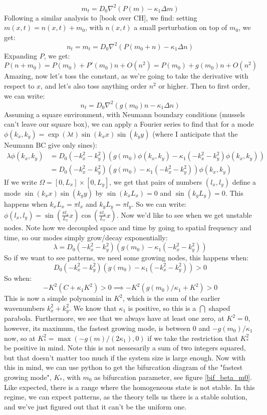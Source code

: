 \documentclass[a4paper]{jpconf}
\begin{document}
\[
m_t = D_0\nabla^2(P(m)-\kappa_1\Delta m)
\]
Following a similar analysis to [book over CH], we find:
setting $m(x,t)=n(x,t)+m_0$, with $n(x,t)$ a small perturbation on top of $m_0$, we get:
\[
n_t = m_t = D_0\nabla^2(P(m_0+n)-\kappa_1\Delta n)
\]
Expanding $P$, we get:
\[
P(n+m_0) = P(m_0)+P'(m_0)n+O(n^2) = P(m_0)+g(m_0)n+O(n^2)
\]
Amazing, now let's toss the constant, as we're going to take the derivative with respect to $x$, and let's also toss anything order $n^2$ or higher. Then to first order, we can write:
\[
n_t  = D_0\nabla^2(g(m_0)n-\kappa_1\Delta n)
\]
Assuming a square environment, with Neumann boundary conditions (mussels can't leave our square box), we can apply a Fourier series to find that for a mode $\phi(k_x,k_y)=\exp(\lambda t)\sin(k_xx)\sin(k_yy)$ (where I anticipate that the Neumann BC give only sines): 
\[\begin{aligned}
\lambda\phi(k_x,k_y) &= D_0(-k_x^2-k_y^2)(g(m_0)\phi(k_x,k_y)-\kappa_1 (-k_x^2-k_y^2) \phi(k_x,k_y))\\
&= D_0(-k_x^2-k_y^2)(g(m_0)-\kappa_1 (-k_x^2-k_y^2) )\phi(k_x,k_y)
\end{aligned}\]
If we write $\Omega=[0,L_x]\times[0,L_y]$, we get that pairs of numbers $(l_x,l_y)$ define a mode $\sin(k_xx)\sin(k_yy)$ by $\sin(k_xL_x)=0$ and $\sin(k_yL_y)=0$. This happens when $k_xL_x =\pi l_x$ and $k_yL_y=\pi l_y$. So we can write: $\phi(l_x,l_y)=\sin\left(\frac{\pi l_x}{L_x}x\right)\cos\left(\frac{\pi l_x}{L_x}x\right)$. 
Now we'd like to see when we get unstable nodes. Note how we decoupled space and time by going to spatial frequency and time, so our modes simply grow/decay exponentially:
\[
\lambda = D_0(-k_x^2-k_y^2)(g(m_0)-\kappa_1 (-k_x^2-k_y^2) )
\]
So if we want to see patterns, we need some growing nodes, this happens when:
\[
D_0(-k_x^2-k_y^2)(g(m_0)-\kappa_1 (-k_x^2-k_y^2) )>0
\]
So when:
\[
-K^2(C+\kappa_1K^2)>0\implies -K^2(g(m_0)/\kappa_1+K^2)>0
\]
This is now a simple polynomial in $K^2$, which is the sum of the earlier wavenumbers $k_x^2+k_y^2$. We know that $\kappa_1$ is positive, so this is a $\bigcap$ shaped parabola. Furthermore, we see that we always have at least one zero, at $K^2=0$, however, its maximum, the fastest growing mode, is between $0$ and $-g(m_0)/\kappa_1$ now, so at $K^2_*=\max(-g(m)/(2\kappa_1),0)$ if we take the restriction that $K^2_*$ be positive in mind. Note this is not nessesarily a sum of two integers squared, but that doesn't matter too much if the system size is large enough. Now with this in mind, we can use python to get the bifurcation diagram of the "fastest growing mode", $K_*$, with $m_0$ as bifurcation parameter, see figure \ref{bif_beta_m0}. 
Like expected, there is a range where the homogeneous state is not stable. In this regime, we can expect patterns, as the theory tells us there is a stable solution, and we've just figured out that it can't be the uniform one. 
\end{document}
